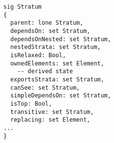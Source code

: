 \lstset{frame=tb, aboveskip=12pt, belowskip=-3pt, breaklines=true, basicstyle=\small\ttfamily, tabsize=2, mathescape=true}
\begin{lstlisting}[caption={base\_structure.als, lines 14-49}, label=alloy:stratum, captionpos=b]
sig Stratum
{
  parent: lone Stratum,
  dependsOn: set Stratum,
  dependsOnNested: set Stratum,
  nestedStrata: set Stratum,
  isRelaxed: Bool,
  ownedElements: set Element,
    -- derived state
  exportsStrata: set Stratum,
  canSee: set Stratum,
  simpleDependsOn: set Stratum,
  isTop: Bool,
  transitive: set Stratum,
  replacing: set Element,
...
}
\end{lstlisting}
